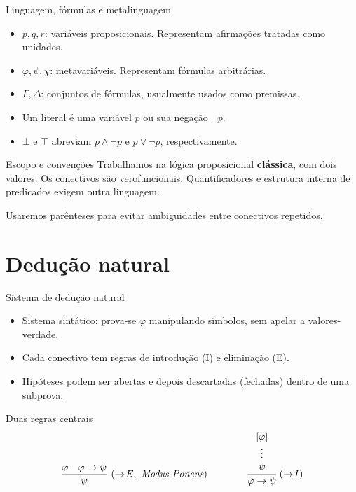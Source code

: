 \documentclass[10pt,aspectratio=169]{beamer}
\newcommand{\dest}[1]{\alert{#1}}
\begin{document}

\begin{frame}{Linguagem, fórmulas e metalinguagem}

\begin{itemize}
\item $p,q,r$: variáveis proposicionais. Representam afirmações tratadas como unidades.
\item $\varphi,\psi,\chi$: metavariáveis. Representam fórmulas arbitrárias.
\item $\Gamma,\Delta$: conjuntos de fórmulas, usualmente usados como premissas.
\item Um \dest{literal} é uma variável $p$ ou sua negação $\neg p$.
\item $\bot$ e $\top$ abreviam $p\land\neg p$ e $p\lor\neg p$, respectivamente.
\end{itemize}
\begin{block}{Escopo e convenções}
Trabalhamos na lógica proposicional \textbf{clássica}, com dois valores.
Os conectivos são verofuncionais. Quantificadores e estrutura interna de predicados exigem outra linguagem.
\end{block}
Usaremos parênteses para evitar ambiguidades entre conectivos repetidos.
\end{frame}

\section{Dedução natural}

\begin{frame}{Sistema de dedução natural}
  \begin{itemize}
    \item Sistema \dest{sintático}: prova-se $\varphi$ manipulando símbolos, sem apelar a valores-verdade.
    \item Cada conectivo tem regras de \dest{introdução} (I) e \dest{eliminação} (E).
    \item Hipóteses podem ser abertas e depois \dest{descartadas} (fechadas) dentro de uma subprova.
  \end{itemize}
  \vspace{4mm}
  \begin{block}{Duas regras centrais}
    \[
      \dfrac{\varphi \quad \varphi\rightarrow\psi}{\psi}\ (\rightarrow\!E,\ \textit{Modus Ponens})
      \qquad\qquad
      \cfrac{\begin{array}{c}[\varphi]\\ \vdots \\ \psi\end{array}}{\varphi\rightarrow\psi}\ (\rightarrow\!I)
    \]
  \end{block}
\end{frame}
\end{document}
